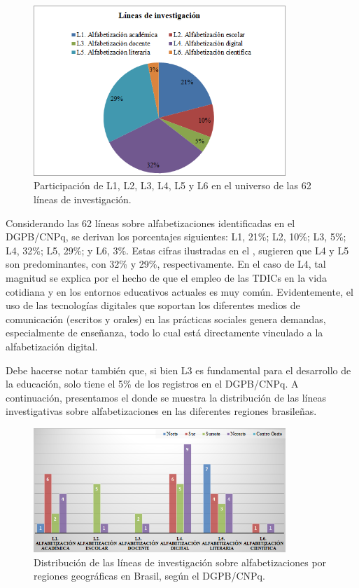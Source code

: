 \documentclass[spanish]{textolivre}
\begin{document}
\begin{figure}[htbp]
 \centering
 \includegraphics[width=0.85\textwidth]{Fig01.png}
 \caption{Participación de L1, L2, L3, L4, L5 y L6 en el universo de las 62 líneas de investigación.}
 \label{fig01}
\end{figure}

Considerando las 62 líneas sobre alfabetizaciones identificadas en el DGPB/CNPq, se derivan los porcentajes siguientes: L1, 21\%; L2, 10\%; L3, 5\%; L4, 32\%; L5, 29\%; y L6, 3\%. Estas cifras ilustradas en el , sugieren que L4 y L5 son predominantes, con 32\% y 29\%, respectivamente. En el caso de L4, tal magnitud se explica por el hecho de que el empleo de las TDICs en la vida cotidiana y en los entornos educativos actuales es muy común. Evidentemente, el uso de las tecnologías digitales que soportan los diferentes medios de comunicación (escritos y orales) en las prácticas sociales genera demandas, especialmente de enseñanza, todo lo cual está directamente vinculado a la alfabetización digital.  

Debe hacerse notar también que, si bien L3 es fundamental para el desarrollo de la educación, solo tiene el 5\% de los registros en el DGPB/CNPq. A continuación, presentamos el  donde se muestra la distribución de las líneas investigativas sobre alfabetizaciones en las diferentes regiones brasileñas.

\begin{figure}[htbp]
 \centering
 \includegraphics[width=0.85\textwidth]{Fig02.png}
 \caption{Distribución de las líneas de investigación sobre alfabetizaciones por regiones geográficas en Brasil, según el DGPB/CNPq.}
 \label{fig02}
\end{figure}
\end{document}
